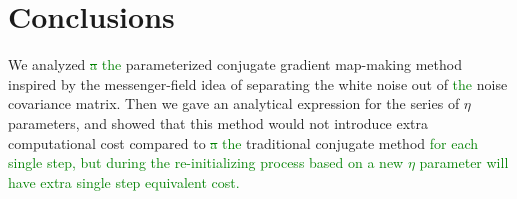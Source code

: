 \documentclass[twocolumn,linenumbers]{aastex631}
\newcommand{\Eq}[1]{\text{Eq.\,\ref{#1}}}
\newcommand{\Figure}[1]{\text{Figure\,\ref{#1}}}
\newcommand{\vbd}{\vb{d}}
\newcommand{\hatm}{\vb{\hat{m}}}
\newcommand{\textgreen}[1]{\textcolor{green}{#1}}
\begin{document}
%
%




\section{Conclusions} \label{sec:conclusions} 


We analyzed \textgreen{\sout{a} the} parameterized conjugate gradient map-making method inspired by the messenger-field idea of
separating the white noise out of \textgreen{the} noise covariance matrix.
Then we gave an analytical expression for the series of $\eta$ parameters,
and showed that this method would not introduce extra computational cost compared to \textgreen{\sout{a} the} traditional conjugate method 
\textgreen{for each single step, but during the re-initializing process based on a new $\eta$ parameter will have extra single step equivalent cost.}
\end{document}

